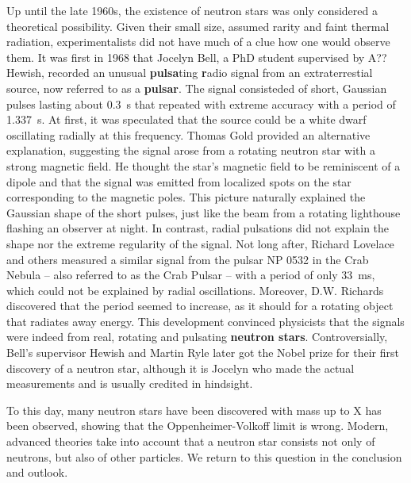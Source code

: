 Up until the late 1960s, the existence of neutron stars was only considered a theoretical possibility.
Given their small size, assumed rarity and faint thermal radiation, experimentalists did not have much of a clue how one would observe them.
It was first in 1968 that Jocelyn Bell, a PhD student supervised by A?? Hewish, recorded an unusual \textbf{pulsa}ting \textbf{r}adio signal from an extraterrestial source, now referred to as a \textbf{pulsar}. \cite{ref:neutron_star_discovery_first}
The signal consisteded of short, Gaussian pulses lasting about \SI{0.3}{\second} that repeated with extreme accuracy with a period of \SI{1.337}{\second}. 
At first, it was speculated that the source could be a white dwarf oscillating radially at this frequency.
Thomas Gold provided an alternative explanation, suggesting the signal arose from a rotating neutron star with a strong magnetic field. \cite{ref:neutron_star_gold}
He thought the star's magnetic field to be reminiscent of a dipole and that the signal was emitted from localized spots on the star corresponding to the magnetic poles.
This picture naturally explained the Gaussian shape of the short pulses, just like the beam from a rotating lighthouse flashing an observer at night.
In contrast, radial pulsations did not explain the shape nor the extreme regularity of the signal.
Not long after, Richard Lovelace and others measured a similar signal from the pulsar NP 0532 in the Crab Nebula -- also referred to as the Crab Pulsar -- with a period of only \SI{33}{\milli\second}, which could not be explained by radial oscillations. \cite{ref:crab_pulsar_period_discovery}
Moreover, D.W. Richards discovered that the period seemed to increase, as it should for a rotating object that radiates away energy.
This development convinced physicists that the signals were indeed from real, rotating and pulsating \textbf{neutron stars}.
Controversially, Bell's supervisor Hewish and Martin Ryle later got the Nobel prize for their first discovery of a neutron star, although it is Jocelyn who made the actual measurements and is usually credited in hindsight.


To this day, many neutron stars have been discovered with mass up to X has been observed, showing that the Oppenheimer-Volkoff limit is wrong.
Modern, advanced theories take into account that a neutron star consists not only of neutrons, but also of other particles.
We return to this question in the conclusion and outlook.



